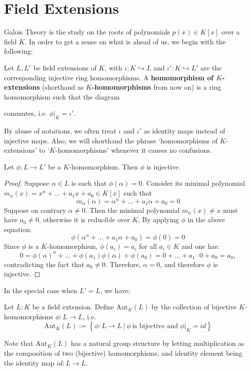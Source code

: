 \chapter{Field Extensions}
Galois Theory is the study on the roots of polynomials \(p(x) \in K[x]\) over a field $K$. In order to get a sense on what is ahead of us, we begin with the following:
\begin{definition}
    Let \(L, L'\) be field extensions of \(K\), with $\iota: K \hookrightarrow L$ and $\iota': K \hookrightarrow L'$
    are the corresponding injective ring homomorphisms.
    A {\bf homomorphism of \(K\)-extensions} (shorthand as {\bf $K$-homomorphisms} from now on) is a ring homomorphism such that the diagram
\begin{center}
\end{center}
commutes, i.e. $\phi|_K = \iota'$.
\end{definition}
By abuse of notations, we often treat $\iota$ and $\iota'$ as identity maps instead of injective maps. Also, we will shorthand the phrase `homomorphisms of $K$-extensions' to `$K$-homomorphisms' whenever it causes no confusions.
\begin{proposition} \label{prop-khominjevtive}
    Let $\phi: L \to L'$ be a $K$-homomorphism. Then $\phi$ is injective.
\end{proposition}
\begin{proof}
    Suppose $\alpha \in L$ is such that $\phi(\alpha) = 0$. Consider its minimal polynomial $m_{\alpha}(x) = x^n + \dots + a_1x + a_0 \in K[x]$ such that
    $$m_{\alpha}(\alpha) = \alpha^n + \dots + a_1 \alpha + a_0 = 0$$
    Suppose on contrary $\alpha \neq 0$. Then the minimal polynomial $m_{\alpha}(x) \neq x$ must have $a_0 \neq 0$, otherwise it is reducible over $K$. By applying $\phi$ in the above equation:
    $$\phi(\alpha^n + \dots + a_1 \alpha + a_0) = \phi(0) = 0$$
    Since $\phi$ is a $K$-homomorphism,  $\phi(a_i) = a_i$ for all $a_i \in K$ and one has:
    $$0 = \phi(\alpha)^n + \dots + \phi(a_1) \phi(\alpha) + \phi(a_0) = 0 + \dots + a_1 \cdot 0 + a_0 = a_0,$$
    contradicting the fact that $a_0 \neq 0$. Therefore, $\alpha = 0$, and therefore $\phi$ is injective.
\end{proof}
In the special case when \(L' = L\), we have:
\begin{definition}
Let $L:K$ be a field extension. Define $\mathrm{Aut}_K(L)$ by the collection of bijective $K$-homomorphisms $\phi:L\to L$, i.e.
\[
     \mathrm{Aut}_K(L) := \left\{\phi: L \to L \ |\ \phi\ \text{is bijective and } \phi|_K = id \right\} 
\]    
\end{definition}
Note that $\mathrm{Aut}_K(L)$ has a natural group structure by letting multiplication as the 
composition of two (bijective) homomorphisms, and identity element being the identity map $id: L \to L$. 

